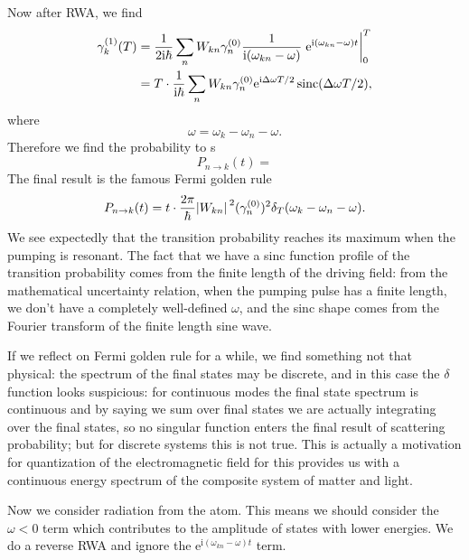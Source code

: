 \documentclass[hyperref, a4paper]{article}
\DeclareMathOperator{\sinc}{sinc}
\newcommand*{\ii}{\mathrm{i}}
\newcommand*{\ee}{\mathrm{e}}
\begin{document}
Now after RWA, we find 
\begin{equation}
    \begin{aligned}
        \gamma^{(1)}_{k}(T) &= \frac{1}{2 \ii \hbar} 
            \sum_n W_{kn} \gamma^{(0)}_n
            \frac{1}{\ii (\omega_{kn} - \omega)}
            \eval{
                \ee^{\ii (\omega_{kn} - \omega) t} 
            }_{0}^T  \\
        &= T \cdot \frac{1}{\ii \hbar} \sum_n 
            W_{kn} \gamma^{(0)}_n \ee^{\ii \Delta \omega T / 2} 
            \sinc(\Delta \omega T / 2),
    \end{aligned} 
\end{equation}
where 
\begin{equation}
    \omega = \omega_k - \omega_n - \omega.
\end{equation}
Therefore we find the probability to s
\begin{equation}
    P_{n \to k}(t) = 
\end{equation}
The final result is the famous Fermi golden rule
\begin{equation}
    P_{n \to k} (t) = t \cdot \frac{2\pi}{\hbar} \abs*{W_{kn}}^2 (\gamma^{(0)}_n)^2 
    \delta_T(\omega_k - \omega_n - \omega).
\end{equation}
We see expectedly that the transition probability reaches its maximum  
when the pumping is resonant.
The fact that we have a sinc function profile of the transition probability 
comes from the finite length of the driving field:
from the mathematical uncertainty relation,
when the pumping pulse has a finite length, 
we don't have a completely well-defined $\omega$,
and the sinc shape comes from the  
Fourier transform of the finite length sine wave.

If we reflect on Fermi golden rule for a while, 
we find something not that physical: 
the spectrum of the final states may be discrete, 
and in this case the $\delta$ function looks suspicious:
for continuous modes the final state spectrum is continuous 
and by saying we sum over final states 
we are actually integrating over the final states, 
so no singular function enters the final result 
of scattering probability;
but for discrete systems this is not true.
This is actually a motivation for quantization of the electromagnetic field
for this provides us with a continuous energy spectrum 
of the composite system of matter and light.

Now we consider radiation from the atom.
This means we should consider the $\omega < 0$ term 
which contributes to the amplitude of states with lower energies.
We do a reverse RWA and ignore the $\ee^{\ii (\omega_{kn} - \omega) t}$ term.
\end{document}
